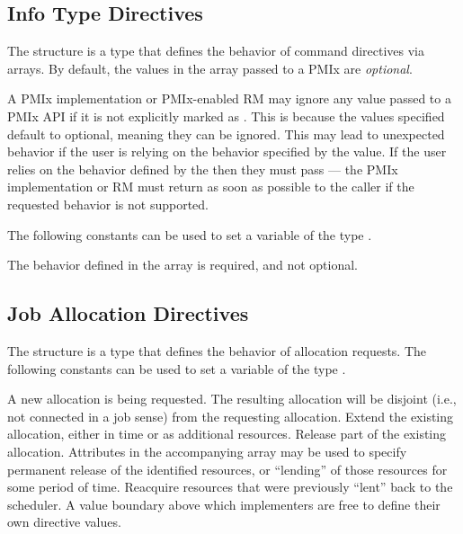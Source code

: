 \subsection{Info Type Directives}

The  structure is a  type that defines the behavior of command directives via  arrays.
By default, the values in the  array passed to a PMIx are \emph{optional}.

\adviceuserstart
A PMIx implementation or PMIx-enabled \ac{RM} may ignore any  value passed to a PMIx API if it is not explicitly marked as .
This is because the values specified default to optional, meaning they can be ignored.
This may lead to unexpected behavior if the user is relying on the behavior specified by the  value.
If the user relies on the behavior defined by the  then they must pass  --- the PMIx implementation or \ac{RM} must return  as soon as possible to the caller if the requested behavior is not supported.
\adviceuserend

The following constants can be used to set a variable of the type .

\begin{constantdesc}
%
The behavior defined in the  array is required, and not optional.
%
\end{constantdesc}



\subsection{Job Allocation Directives}

The  structure is a  type that defines the behavior of allocation requests.
The following constants can be used to set a variable of the type .

\begin{constantdesc}
%
A new allocation is being requested.
The resulting allocation will be disjoint (i.e., not connected in a job sense) from the requesting allocation.
%
Extend the existing allocation, either in time or as additional resources.
%
Release part of the existing allocation.
Attributes in the accompanying  array may be used to specify permanent release of the identified resources, or ``lending'' of those resources for some period of time.
%
Reacquire resources that were previously ``lent'' back to the scheduler.
%
A value boundary above which implementers are free to define their own directive values.
%
\end{constantdesc}



